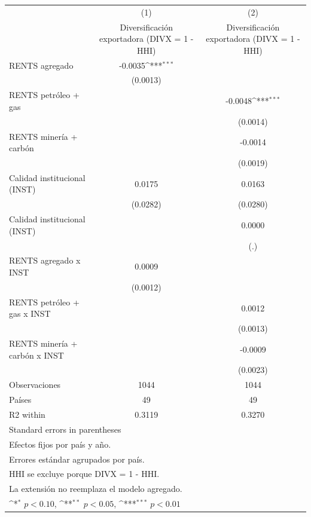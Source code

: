 {
\def\sym#1{\ifmmode^{#1}\else\(^{#1}\)\fi}
\begin{tabular}{l*{2}{c}}
\toprule
                    &\multicolumn{1}{c}{(1)}&\multicolumn{1}{c}{(2)}\\
                    &\multicolumn{1}{c}{Diversificación exportadora (DIVX = 1 - HHI)}&\multicolumn{1}{c}{Diversificación exportadora (DIVX = 1 - HHI)}\\
\midrule
RENTS agregado      &     -0.0035\sym{***}&                     \\
                    &    (0.0013)         &                     \\
\addlinespace
RENTS petróleo + gas&                     &     -0.0048\sym{***}\\
                    &                     &    (0.0014)         \\
\addlinespace
RENTS minería + carbón&                     &     -0.0014         \\
                    &                     &    (0.0019)         \\
\addlinespace
Calidad institucional (INST)&      0.0175         &      0.0163         \\
                    &    (0.0282)         &    (0.0280)         \\
\addlinespace
Calidad institucional (INST)&                     &      0.0000         \\
                    &                     &         (.)         \\
\addlinespace
RENTS agregado x INST&      0.0009         &                     \\
                    &    (0.0012)         &                     \\
\addlinespace
RENTS petróleo + gas x INST&                     &      0.0012         \\
                    &                     &    (0.0013)         \\
\addlinespace
RENTS minería + carbón x INST&                     &     -0.0009         \\
                    &                     &    (0.0023)         \\
\midrule
Observaciones       &        1044         &        1044         \\
Países              &          49         &          49         \\
R2 within           &      0.3119         &      0.3270         \\
\bottomrule
\multicolumn{3}{l}{\footnotesize Standard errors in parentheses}\\
\multicolumn{3}{l}{\footnotesize Efectos fijos por país y año.}\\
\multicolumn{3}{l}{\footnotesize Errores estándar agrupados por país.}\\
\multicolumn{3}{l}{\footnotesize HHI se excluye porque DIVX = 1 - HHI.}\\
\multicolumn{3}{l}{\footnotesize La extensión no reemplaza el modelo agregado.}\\
\multicolumn{3}{l}{\footnotesize \sym{*} \(p<0.10\), \sym{**} \(p<0.05\), \sym{***} \(p<0.01\)}\\
\end{tabular}
}
